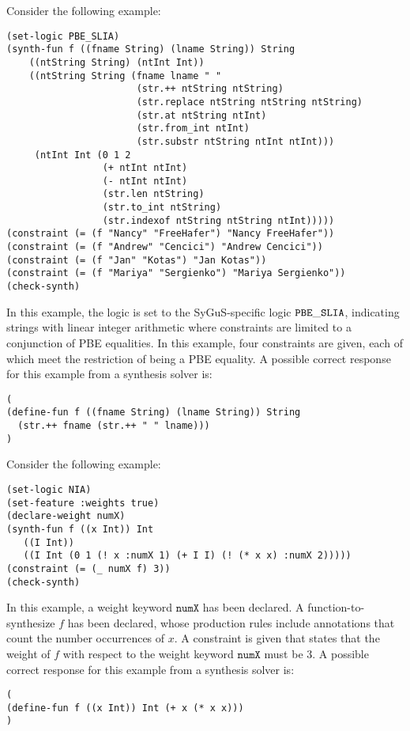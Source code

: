 \documentclass[english,a4paper,10pt]{article}
\begin{document}
\begin{example}
Consider the following example:
\begin{lstlisting}[language=SyGuS]
(set-logic PBE_SLIA)
(synth-fun f ((fname String) (lname String)) String
    ((ntString String) (ntInt Int))
    ((ntString String (fname lname " "
                       (str.++ ntString ntString)
                       (str.replace ntString ntString ntString)
                       (str.at ntString ntInt)
                       (str.from_int ntInt)
                       (str.substr ntString ntInt ntInt)))
     (ntInt Int (0 1 2
                 (+ ntInt ntInt)
                 (- ntInt ntInt)
                 (str.len ntString)
                 (str.to_int ntString)
                 (str.indexof ntString ntString ntInt)))))
(constraint (= (f "Nancy" "FreeHafer") "Nancy FreeHafer"))
(constraint (= (f "Andrew" "Cencici") "Andrew Cencici"))
(constraint (= (f "Jan" "Kotas") "Jan Kotas"))
(constraint (= (f "Mariya" "Sergienko") "Mariya Sergienko"))
(check-synth)
\end{lstlisting}
In this example, the logic is set to the SyGuS-specific logic
${\tt PBE\_SLIA}$, indicating strings with linear integer arithmetic
where constraints are limited to a conjunction of PBE equalities.
In this example, four constraints are given, each of which meet the
restriction of being a PBE equality.
A possible correct response for this example from a synthesis solver is:
\begin{lstlisting}[language=SyGuS]
(
(define-fun f ((fname String) (lname String)) String
  (str.++ fname (str.++ " " lname)))
)
\end{lstlisting}
\end{example}

\begin{example}[Weights]
Consider the following example:
\begin{lstlisting}[language=SyGuS]
(set-logic NIA)
(set-feature :weights true)
(declare-weight numX)
(synth-fun f ((x Int)) Int
   ((I Int))
   ((I Int (0 1 (! x :numX 1) (+ I I) (! (* x x) :numX 2)))))
(constraint (= (_ numX f) 3))
(check-synth)
\end{lstlisting}
In this example, a weight keyword $\texttt{numX}$ has been declared.
A function-to-synthesize $f$ has been declared, whose production
rules include annotations that count the number occurrences of $x$.
A constraint is given that states that the weight of $f$ with respect to
the weight keyword $\texttt{numX}$ must be $3$.
A possible correct response for this example from a synthesis solver is:
\begin{lstlisting}[language=SyGuS]
(
(define-fun f ((x Int)) Int (+ x (* x x)))
)
\end{lstlisting}
\end{example}
\end{document}
